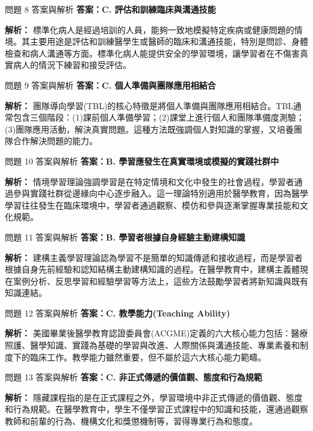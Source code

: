 \documentclass[aspectratio=169]{beamer}
\begin{document}
\begin{frame}{問題 8 答案與解析}
  \textbf{答案：C. 評估和訓練臨床與溝通技能}
  
  \textbf{解析：} 標準化病人是經過培訓的人員，能夠一致地模擬特定疾病或健康問題的情境。其主要用途是評估和訓練醫學生或醫師的臨床和溝通技能，特別是問診、身體檢查和病人溝通等方面。標準化病人能提供安全的學習環境，讓學習者在不傷害真實病人的情況下練習和接受評估。
\end{frame}

\begin{frame}{問題 9 答案與解析}
  \textbf{答案：C. 個人準備與團隊應用相結合}
  
  \textbf{解析：} 團隊導向學習(TBL)的核心特徵是將個人準備與團隊應用相結合。TBL通常包含三個階段：(1)課前個人準備學習；(2)課堂上進行個人和團隊準備度測驗；(3)團隊應用活動，解決真實問題。這種方法既強調個人對知識的掌握，又培養團隊合作解決問題的能力。
\end{frame}

\begin{frame}{問題 10 答案與解析}
  \textbf{答案：B. 學習應發生在真實環境或模擬的實踐社群中}
  
  \textbf{解析：} 情境學習理論強調學習是在特定情境和文化中發生的社會過程，學習者通過參與實踐社群從邊緣向中心逐步融入。這一理論特別適用於醫學教育，因為醫學學習往往發生在臨床環境中，學習者通過觀察、模仿和參與逐漸掌握專業技能和文化規範。
\end{frame}

\begin{frame}{問題 11 答案與解析}
  \textbf{答案：B. 學習者根據自身經驗主動建構知識}
  
  \textbf{解析：} 建構主義學習理論認為學習不是簡單的知識傳遞和接收過程，而是學習者根據自身先前經驗和認知結構主動建構知識的過程。在醫學教育中，建構主義體現在案例分析、反思學習和經驗學習等方法上，這些方法鼓勵學習者將新知識與既有知識連結。
\end{frame}

\begin{frame}{問題 12 答案與解析}
  \textbf{答案：C. 教學能力(Teaching Ability)}
  
  \textbf{解析：} 美國畢業後醫學教育認證委員會(ACGME)定義的六大核心能力包括：醫療照護、醫學知識、實踐為基礎的學習與改進、人際關係與溝通技能、專業素養和制度下的臨床工作。教學能力雖然重要，但不屬於這六大核心能力範疇。
\end{frame}

\begin{frame}{問題 13 答案與解析}
  \textbf{答案：C. 非正式傳遞的價值觀、態度和行為規範}
  
  \textbf{解析：} 隱藏課程指的是在正式課程之外，學習環境中非正式傳遞的價值觀、態度和行為規範。在醫學教育中，學生不僅學習正式課程中的知識和技能，還通過觀察教師和前輩的行為、機構文化和獎懲機制等，習得專業行為和態度。
\end{frame}
\end{document}
